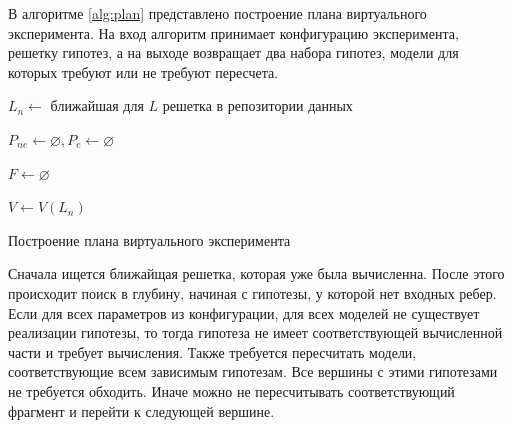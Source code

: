 В алгоритме \ref{alg:plan} представлено построение плана виртуального эксперимента. На вход алгоритм принимает 
конфигурацию эксперимента, решетку гипотез, а на выходе возвращает два набора гипотез, модели для которых требуют или 
не требуют пересчета.



\begin{algorithm}


    $L_{n} \gets $ ближайшая для $L$ решетка в репозитории данных

    $P_{ne} \gets \varnothing , P_{e} \gets \varnothing $ 

    $F \gets \varnothing $

    $V \gets V(L_n)$

        
    \caption{Построение плана виртуального эксперимента}\label{alg:plan}
\end{algorithm}

Сначала ищется ближайщая решетка, которая уже была вычисленна. После этого происходит поиск в глубину, начиная с 
гипотезы, у которой нет входных ребер. Если для всех параметров из конфигурации, для всех моделей не существует 
реализации гипотезы, то тогда гипотеза не имеет соответствующей вычисленной части и требует вычисления. Также 
требуется пересчитать модели, соответствующие всем зависимым гипотезам. Все вершины с этими гипотезами 
не требуется обходить. Иначе можно не пересчитывать соответствующий фрагмент и перейти к следующей вершине. 

